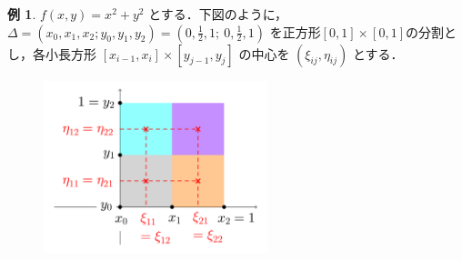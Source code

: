 \documentclass[10pt, uplatex, dvipdfmx]{jsarticle}
\theoremstyle{definition}
\newtheorem{example}[theorem]{例}
\numberwithin{equation}{section}
\newcommand{\ds}{\displaystyle}
\begin{document}
\begin{example}
  $\ds f(x,y) = x^2+y^2$
  とする．下図のように，$\Delta=\left(x_0, x_1, x_2; y_0, y_1, y_2\right) = \left(0,
    \frac{1}{2}, 1;\ 0, \frac{1}{2}, 1\right)$
  を正方形$[0,1] \times [0,1]$の分割とし，各小長方形
  $[x_{i-1}, x_{i}] \times [y_{j-1}, y_j]$ の中心を $(\xi_{ij},
  \eta_{ij})$ とする．
  \begin{figure}[h]
    \centering
    \includegraphics[height=5cm]{./pictures/07/Rep3D.pdf}\\
  \end{figure}
  

\end{example}
\end{document}

